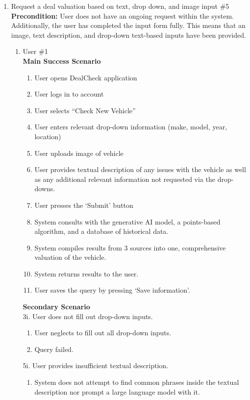 \documentclass[]{article}
\begin{document}
\begin{enumerate}[{\bf {BE}1.}]
	\item Request a deal valuation based on text, drop down, and image input \#5 \\

	{\bf Precondition:} User does not have an ongoing request within the system. Additionally, 
	the user has completed the input form fully. This means that an image, 
	text description, and drop-down text-based inputs have been provided.
	\begin{enumerate}[{\bf VP1.}]
		\item User \#1 \\
		{\bf Main Success Scenario}
		\begin{enumerate}[1.]
			\item User opens DealCheck application
			\item User logs in to account
			\item User selects “Check New Vehicle”
			\item User enters relevant drop-down information (make, model, year, location)
			\item User uploads image of vehicle
			\item User provides textual description of any issues with the vehicle as well as any additional relevant information not requested via the drop-downs.
			\item User presses the ‘Submit’ button
			\item System consults with the generative AI model, a points-based algorithm, and a database of historical data.
			\item System compiles results from 3 sources into one, comprehensive valuation of the vehicle.
			\item System returns results to the user.
			\item User saves the query by pressing ‘Save information’.
		\end{enumerate}
		{\bf Secondary Scenario} \\
		3i. User does not fill out drop-down inputs.
		\begin{enumerate}[{3i}.1]
			\item User neglects to fill out all drop-down inputs.
			\item Query failed.
		\end{enumerate}
		5i. User provides insufficient textual description.
		\begin{enumerate}[{5i}.1]
			\item System does not attempt to find common phrases inside the textual description nor prompt a large language model with it.

\end{enumerate}
\end{enumerate}
\end{enumerate}
\end{document}
